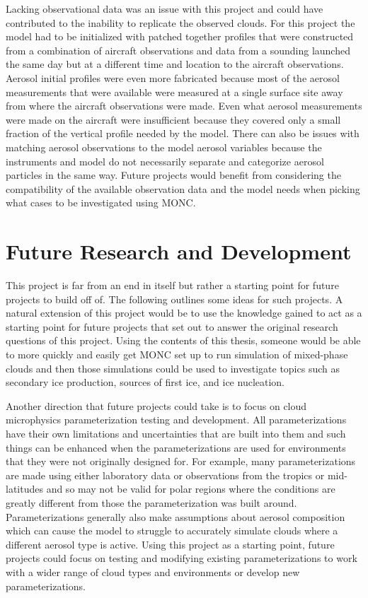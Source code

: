 Lacking observational data was an issue with this project and could have contributed to the inability to replicate the observed clouds. For this project the model had to be initialized with patched together profiles that were constructed from a combination of aircraft observations and data from a sounding launched the same day but at a different time and location to the aircraft observations. Aerosol initial profiles were even more fabricated because most of the aerosol measurements that were available were measured at a single surface site away from where the aircraft observations were made. Even what aerosol measurements were made on the aircraft were insufficient because they covered only a small fraction of the vertical profile needed by the model. There can also be issues with matching aerosol observations to the model aerosol variables because the instruments and model do not necessarily separate and categorize aerosol particles in the same way. Future projects would benefit from considering the compatibility of the available observation data and the model needs when picking what cases to be investigated using MONC.

\section{Future Research and Development} \label{ch:future}
This project is far from an end in itself but rather a starting point for future projects to build off of. The following outlines some ideas for such projects. A natural extension of this project would be to use the knowledge gained to act as a starting point for future projects that set out to answer the original research questions of this project. Using the contents of this thesis, someone would be able to more quickly and easily get MONC set up to run simulation of mixed-phase clouds and then those simulations could be used to investigate topics such as secondary ice production, sources of first ice, and ice nucleation.

Another direction that future projects could take is to focus on cloud microphysics parameterization testing and development. All parameterizations have their own limitations and uncertainties that are built into them and such things can be enhanced when the parameterizations are used for environments that they were not originally designed for. For example, many parameterizations are made using either laboratory data or observations from the tropics or mid-latitudes and so may not be valid for polar regions where the conditions are greatly different from those the parameterization was built around. Parameterizations generally also make assumptions about aerosol composition which can cause the model to struggle to accurately simulate clouds where a different aerosol type is active. Using this project as a starting point, future projects could focus on testing and modifying existing parameterizations to work with a wider range of cloud types and environments or develop new parameterizations.

